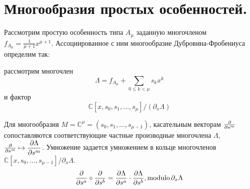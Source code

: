 \section{Многообразия простых особенностей.}
Рассмотрим простую особенность типа \(A_{\mu}\) заданную многочленом \(f_{A_{\mu}} = \frac{1}{\mu+1}x^{\mu +1}\). Ассоциированное с ним многообразие Дубровина-Фробениуса определим так:\par 
рассмотрим многочлен \[\Lambda = f_{A_{\mu}} + \sum_{0 \leq k < \mu} s_k x^k\] и фактор \[\mathbb{C}[x, s_0, s_1, \dots, s_\mu]\Big/(\partial_x \Lambda)\]  

Для многообразия \(M = \mathbb{C}^{\mu} = (s_0, s_1, \dots, s_{\mu-1})\), касательным векторам \(\tang[s^m]\) сопоставляются соответствующие частные производные многочлена \(\Lambda\), \(\tang[s^m] \mapsto	\dfrac{\partial\Lambda}{\partial s^m}\). Умножение задается умножением в кольце многочленов \(\mathbb{C}[x, s_0, \dots, s_{\mu-1}]/\partial_x \Lambda\).
\[\tang[s^a]\circ\tang[s^b] = \dfrac{\partial\Lambda}{\partial s^a} \cdot \dfrac{\partial\Lambda}{\partial s^b}, \operatorname{modulo} \partial_x\Lambda\]

